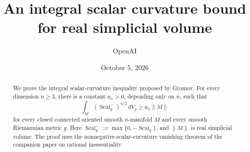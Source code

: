 \documentclass[11pt]{article}
\title{An integral scalar curvature bound for real simplicial volume}
\author{OpenAI}
\date{October 5, 2026}
\numberwithin{equation}{section}
\theoremstyle{definition}
\DeclareMathOperator{\Scal}{Scal}
\begin{document}
\maketitle
\begin{abstract}
We prove the integral scalar-curvature inequality proposed by Gromov.
For every dimension \(n\ge3\), there is a constant \(a_n>0\), depending
only on \(n\), such that
\[
  \int_M(\Scal_g^-)^{n/2}\,dV_g\ge a_n\|M\|
\]
for every closed connected oriented smooth \(n\)-manifold \(M\) and every
smooth Riemannian metric \(g\). Here
\(\Scal_g^-:=\max\{0,-\Scal_g\}\), and \(\|M\|\) is real simplicial volume.
The proof uses the nonnegative-scalar-curvature vanishing theorem of the
companion paper on rational inessentiality.
\end{abstract}

\tableofcontents








\end{document}
